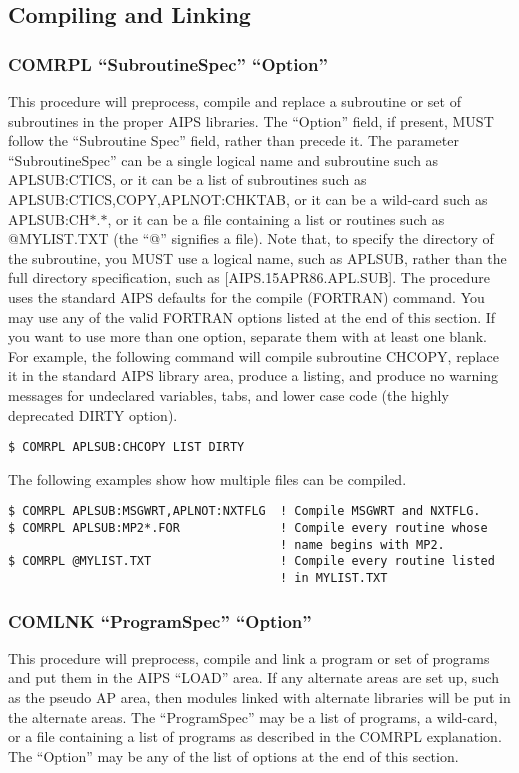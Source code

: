 \subsection{Compiling and Linking}

\subsubsection{COMRPL ``SubroutineSpec'' ``Option''}
This procedure will preprocess, compile and replace a subroutine or set of
subroutines in the proper AIPS libraries.  The ``Option'' field, if
present, MUST follow the ``Subroutine Spec'' field, rather than precede
it.  The parameter ``SubroutineSpec'' can be a single logical name and
subroutine such as APLSUB:CTICS, or it can be a list of subroutines
such as APLSUB:CTICS,COPY,APLNOT:CHKTAB, or it can be a wild-card such
as APLSUB:CH$\ast$.$\ast$, or it can be a file containing a list or routines
such as @MYLIST.TXT (the ``@'' signifies a file). Note that, to specify
the directory of the subroutine, you MUST use a logical name, such as
APLSUB, rather than the full directory specification, such as
[AIPS.15APR86.APL.SUB].  The procedure uses the standard AIPS defaults
for the compile (FORTRAN) command.
You may use any of the valid FORTRAN options listed at the end of this
section.  If you want to use more than one option, separate them with
at least one blank.  For example, the following command will compile
subroutine CHCOPY, replace it in the standard AIPS library area,
produce a listing, and produce no warning messages for undeclared
variables, tabs, and lower case code (the highly deprecated DIRTY
option).


\begin{verbatim}
$ COMRPL APLSUB:CHCOPY LIST DIRTY

\end{verbatim}
The following examples show how multiple files can be compiled.

\begin{verbatim}
$ COMRPL APLSUB:MSGWRT,APLNOT:NXTFLG  ! Compile MSGWRT and NXTFLG.
$ COMRPL APLSUB:MP2*.FOR              ! Compile every routine whose
                                      ! name begins with MP2.
$ COMRPL @MYLIST.TXT                  ! Compile every routine listed
                                      ! in MYLIST.TXT

\end{verbatim}

\subsubsection{COMLNK ``ProgramSpec'' ``Option''}
This procedure will preprocess, compile and link a program or set of
programs and put them in the AIPS ``LOAD'' area.  If any alternate
areas are set up, such as the pseudo AP area, then modules linked with
alternate libraries will be put in the alternate areas.  The
``ProgramSpec'' may be a list of programs, a wild-card, or a file
containing a list of programs as described in the COMRPL explanation.
The ``Option'' may be any of the list of options at the end of this
section.



